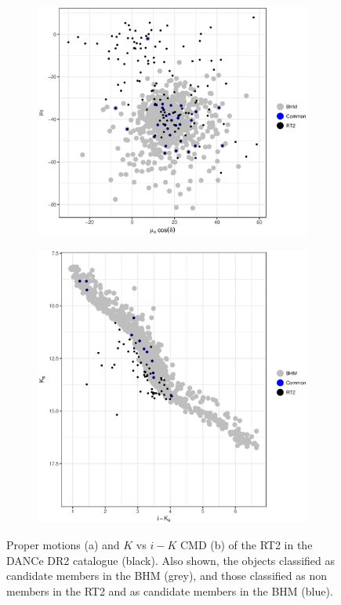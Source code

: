 \begin{figure}[ht!]
    \centering
    \begin{subfigure}[t]{0.45\textwidth}
    \centering
       \includegraphics[width=\textwidth]{background/Figures/RT2_pm.eps}
        \caption{}
    \end{subfigure}
    \begin{subfigure}[t]{0.45\textwidth}
    \centering
     \includegraphics[width=\textwidth]{background/Figures/RT2_ph.eps}
        \caption{}
    \end{subfigure}
\caption{Proper motions (a) and $K$ vs $i-K$ CMD (b) of the RT2 in the DANCe DR2 catalogue (black). Also shown, the objects classified as candidate members in the BHM (grey), and those classified as non members in the RT2 and as candidate members in the BHM (blue).}
\label{fig:RT2}
\end{figure}
 
